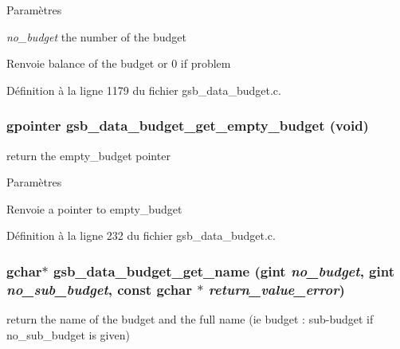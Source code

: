 \begin{DoxyParams}{Paramètres}
\item[{\em no\_\-budget}]the number of the budget\end{DoxyParams}
\begin{DoxyReturn}{Renvoie}
balance of the budget or 0 if problem 
\end{DoxyReturn}


Définition à la ligne 1179 du fichier gsb\_\-data\_\-budget.c.

\subsubsection[{gsb\_\-data\_\-budget\_\-get\_\-empty\_\-budget}]{\setlength{\rightskip}{0pt plus 5cm}gpointer gsb\_\-data\_\-budget\_\-get\_\-empty\_\-budget (void)}\label{gsb__data__budget_8c_a762dd3d7423ddd596a1a827b0a09774b}
return the empty\_\-budget pointer


\begin{DoxyParams}{Paramètres}
\item[{\em }]\end{DoxyParams}
\begin{DoxyReturn}{Renvoie}
a pointer to empty\_\-budget 
\end{DoxyReturn}


Définition à la ligne 232 du fichier gsb\_\-data\_\-budget.c.

\subsubsection[{gsb\_\-data\_\-budget\_\-get\_\-name}]{\setlength{\rightskip}{0pt plus 5cm}gchar$\ast$ gsb\_\-data\_\-budget\_\-get\_\-name (gint {\em no\_\-budget}, \/  gint {\em no\_\-sub\_\-budget}, \/  const gchar $\ast$ {\em return\_\-value\_\-error})}\label{gsb__data__budget_8c_af857141b1d34674997a047500fd76060}
return the name of the budget and the full name (ie budget : sub-\/budget if no\_\-sub\_\-budget is given)


